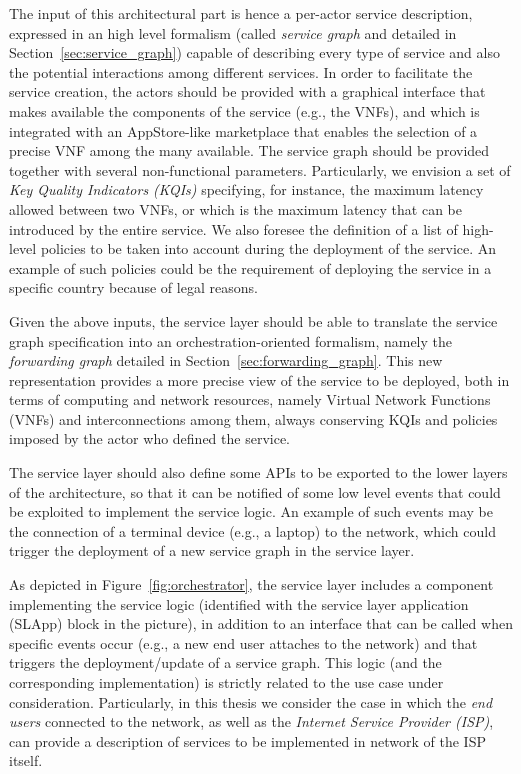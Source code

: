 The input of this architectural part is hence a per-actor service description, expressed in an high level formalism  (called \textit{service graph} and detailed in Section~\ref{sec:service_graph}) capable of describing every type of service and also the potential interactions among different services. 
In order to facilitate the service creation, the actors should be provided with a graphical interface that makes available the components of the service (e.g., the VNFs), and which is integrated with an AppStore-like marketplace that enables the selection of a precise VNF among the many available.
The service graph should be provided together with several non-functional parameters. 
Particularly, we envision a set of \textit{Key Quality Indicators (KQIs)} specifying, for instance, the maximum latency allowed between two VNFs, or which is the maximum latency that can be introduced by the entire service. 
We also foresee the definition of a list of high-level policies to be taken into account during the deployment of the service.
An example of such policies could be the requirement of deploying the service in a specific country because of legal reasons.

Given the above inputs, the service layer should be able to translate the service graph specification into an orchestration-oriented formalism, namely the \textit{forwarding graph} detailed in Section~\ref{sec:forwarding_graph}. 
This new representation provides a more precise view of the service to be deployed, both in terms of computing and network resources, namely Virtual Network Functions (VNFs) and interconnections among them, always conserving KQIs and policies imposed by the actor who defined the service.

The service layer should also define some APIs to be exported to the lower layers of the architecture, so that it can be notified of some low level events that could be exploited to implement the service logic. 
An example of such events may be the connection of a terminal device (e.g., a laptop) to the network, which could trigger the deployment of a new service graph in the service layer.

As depicted in Figure~\ref{fig:orchestrator}, the service layer includes a component implementing the service logic (identified with the service layer application (SLApp) block in the picture), in addition to an interface that can be called when specific events occur (e.g., a new end user attaches to the network) and that triggers the deployment/update of a service graph. This logic (and the corresponding implementation) is strictly related to the use case under consideration. 
Particularly, in this thesis we consider the case in which the \textit{end users} connected to the network, as well as the \textit{Internet Service Provider (ISP)}, can provide a description of services to be implemented in network of the ISP itself.

